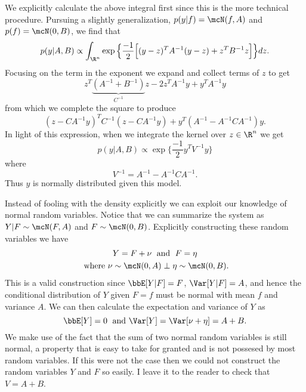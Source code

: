 \documentclass{report}
\begin{document}
We explicitly calculate the above integral first since this is the more technical procedure.  Pursuing a slightly generalization, 
$p(y|f) = \mcN(f, A)$ and $p(f) = \mcN(0, B)$, we find that
\[
p(y | A, B) \propto \int_{\R^n} \exp \Big\{ \frac{-1}{2} \Big[ (y-z)^T A^{-1}(y-z) + z^T B^{-1} z \Big] \Big\} dz.
\]
Focusing on the term in the exponent we expand and collect terms of $z$ to get
\[
z^T \underbrace{(A^{-1} + B^{-1})}_{C^{-1}} z - 2 z^T A^{-1} y + y^T A^{-1} y
\]
from which we complete the square to produce
\[
(z - CA^{-1}y)^T C^{-1} (z - CA^{-1} y) + y^T(A^{-1} - A^{-1} C A^{-1}) y.
\]
In light of this expression, when we integrate the kernel over $z \in \R^n$ we get
\[
p(y | A, B) \propto \exp \Big\{ \frac{-1}{2} y^T V^{-1} y \Big\}
\]
where
\[
V^{-1} = A^{-1} - A^{-1} C A^{-1}.
\]
Thus $y$ is normally distributed given this model.

Instead of fooling with the density explicitly we can exploit our knowledge of normal random variables.  Notice that we can summarize the system as $Y|F \sim \mcN(F, A)$ and $F \sim \mcN(0, B)$.  Explicitly constructing these random variables we have
\begin{gather*}
Y = F + \nu \; \textmd{ and } \; F = \eta \\
\textmd{ where } \nu \sim \mcN(0,A) \perp \eta \sim \mcN(0,B).
\end{gather*}
This is a valid construction since $\bbE[Y|F] = F$, $\Var[Y|F] = A$, and hence the conditional distribution of $Y$ given $F = f$ must be normal with mean $f$ and variance $A$.  We can then calculate the expectation and variance of $Y$ as
\[
\bbE[Y] = 0 \; \textmd{ and } \Var[Y] = \Var[\nu + \eta] = A + B.
\]
We make use of the fact that the sum of two normal random variables is still normal, a property that is easy to take for granted and is not possesed by most random variables.  If this were not the case then we could not construct the random variables $Y$ and $F$ so easily.  I leave it to the reader to check that $V = A + B$.
\end{document}
